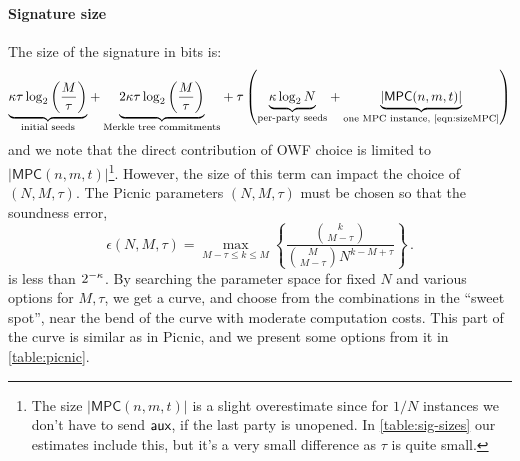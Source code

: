 \paragraph{Signature size}
The size of the signature in bits is:
\begin{align*}
\textunderbrace{\secpar\tau\log_2\left(\frac{M}{\tau}\right)}{initial seeds} + 
\textunderbrace{2\secpar\tau\log_2\left(\frac{M}{\tau}\right)}{Merkle tree commitments} + 
\tau\left( 
     \textunderbrace{\secpar\log_2N}{per-party seeds}  + 
     \textunderbrace{|\textsf{MPC}(n,m,t)|}{one MPC instance, \cref{eqn:sizeMPC}} 
\right)
\end{align*} 
and we note that the direct contribution of OWF choice is limited to
$|\textsf{MPC}(n,m,t)|$\footnote{The size $|\textsf{MPC}(n,m,t)|$ is a slight
overestimate since for $1/N$ instances we don't have to send $\textsf{aux}$, if the
last party is unopened. In \cref{table:sig-sizes} our estimates include this,
but it's a very small difference as $\tau$ is quite small. }.  However, the
size of this term can impact the choice of $(N,M,\tau)$.  The Picnic parameters
$(N, M, \tau)$ must be chosen so that the soundness error, 
\begin{equation*} \label{eqn:soundness}
    \epsilon(N,M,\tau) = \max_{M-\tau \le k \le M} \left\lbrace  \frac{\binom{k}{M-\tau} }{\binom{M}{M-\tau} N^{k-M+\tau} } \right\rbrace\,.
\end{equation*}
is less than $2^{-\kappa}$.
By searching the parameter space for fixed $N$ and various options for $M,
\tau$, we get a curve, and choose from the combinations in the ``sweet spot'',
near the bend of the curve with moderate computation costs. This part of the curve is
similar as in Picnic, and we present some options from it in \cref{table:picnic}.

